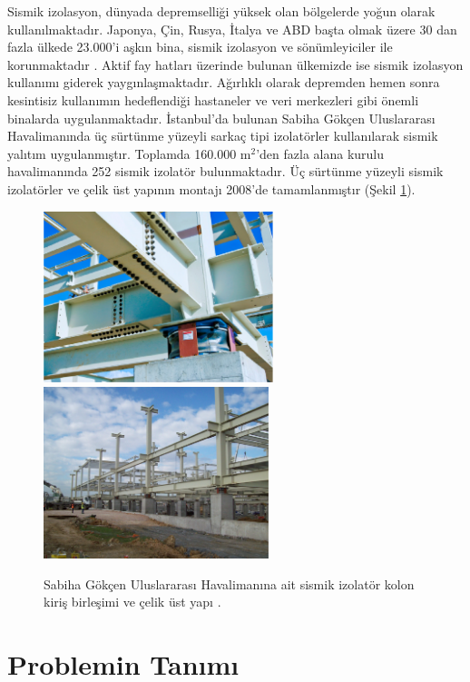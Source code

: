 Sismik izolasyon, dünyada depremselliği yüksek olan bölgelerde yoğun
olarak kullanılmaktadır. Japonya, Çin, Rusya, İtalya ve ABD başta
olmak üzere 30 dan fazla ülkede 23.000'i aşkın bina, sismik izolasyon
ve sönümleyiciler ile korunmaktadır \cite{Martelli2014}. Aktif fay
hatları üzerinde bulunan ülkemizde ise sismik izolasyon kullanımı
giderek yaygınlaşmaktadır. Ağırlıklı olarak depremden hemen sonra
kesintisiz kullanımın hedeflendiği hastaneler ve veri merkezleri gibi
önemli binalarda uygulanmaktadır. İstanbul'da bulunan Sabiha Gökçen
Uluslararası Havalimanında üç sürtünme yüzeyli sarkaç tipi izolatörler
kullanılarak sismik yalıtım uygulanmıştır. Toplamda 160.000 $\mathrm{m^{2}}$'den
fazla alana kurulu havalimanında 252 sismik izolatör bulunmaktadır.
Üç sürtünme yüzeyli sismik izolatörler ve çelik üst yapının montajı
2008'de tamamlanmıştır (Şekil \ref{fig:SabihaG=0000F6k=0000E7en}).
\begin{figure}[h!]
\centering{}\includegraphics[height=5cm]{fig/a.PNG} \hspace{1cm}
\includegraphics[height=5cm]{fig/b.PNG} \vspace{6pt}
 \caption{\label{fig:SabihaG=0000F6k=0000E7en} Sabiha Gökçen Uluslararası Havalimanına
ait sismik izolatör kolon kiriş birleşimi ve çelik üst yapı \cite{Zekioglu2009}.}
\end{figure}

\newpage{}

\section{Problemin Tanımı}

